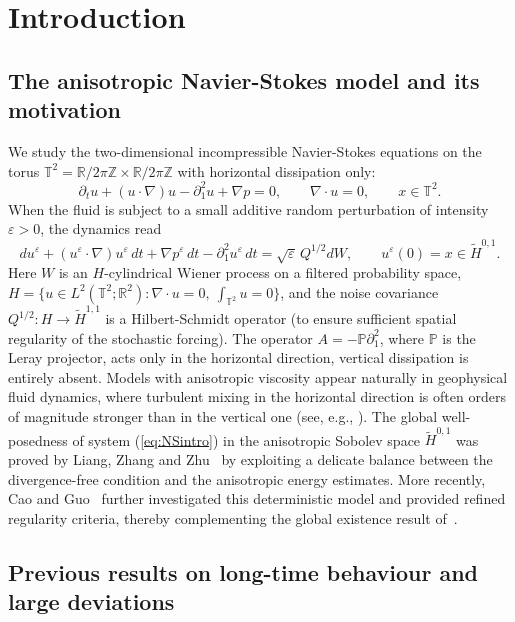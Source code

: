 \documentclass[11pt,a4paper,reqno]{amsart}
\theoremstyle{definition}
\begin{document}
\section{Introduction}
\label{sec:intro}

\subsection{The anisotropic Navier-Stokes model and its motivation}
We study the two-dimensional incompressible Navier-Stokes equations on the
torus $\mathbb{T}^2 = \mathbb{R}/2\pi\mathbb{Z} \times \mathbb{R}/2\pi\mathbb{Z}$ with horizontal dissipation only:
\begin{equation}\label{eq:NSintro}
  \partial_t u + (u\cdot\nabla)u - \partial_1^2 u + \nabla p = 0,\qquad
  \nabla\cdot u = 0,\qquad x\in\mathbb{T}^2 .
\end{equation}
When the fluid is subject to a small additive random perturbation of intensity
$\varepsilon>0$, the dynamics read
\begin{equation}\label{eq:SNSintro}
  du^\varepsilon + (u^\varepsilon\cdot\nabla)u^\varepsilon \,dt + \nabla p^\varepsilon \,dt
  - \partial_1^2 u^\varepsilon \,dt = \sqrt\varepsilon \, Q^{1/2} dW,\qquad
  u^\varepsilon(0)=x\in\widetilde H^{0,1}.
\end{equation}
Here $W$ is an $H$-cylindrical Wiener process on a filtered probability space,
$H=\{u\in L^2(\mathbb{T}^2;\mathbb{R}^2):\nabla\cdot u=0,\ \int_{\mathbb{T}^2}u=0\}$, and the noise
covariance $Q^{1/2}:H\to\widetilde H^{1,1}$ is a Hilbert-Schmidt operator
(to ensure sufficient spatial regularity of the stochastic forcing).  The
operator $A=-\mathbb P\partial_1^2$, where $\mathbb P$ is the Leray projector,
acts only in the horizontal direction, vertical dissipation is entirely absent.
Models with anisotropic viscosity appear naturally in geophysical fluid dynamics,
where turbulent mixing in the horizontal direction is often orders of magnitude
stronger than in the vertical one (see, e.g., \cite{CushmanRoisin, Pedlosky}).
The global well-posedness of system (\ref{eq:NSintro}) in
the anisotropic Sobolev space $\widetilde H^{0,1}$ was proved by Liang, Zhang
and Zhu~\cite{LZZ} by exploiting a delicate balance between the divergence-free condition
 and the anisotropic energy estimates.  More recently, Cao and Guo~\cite{CaoGuo2026} further
investigated this deterministic model and provided refined regularity criteria,
thereby complementing the global existence result of~\cite{LZZ}.


\subsection{Previous results on long-time behaviour and large deviations}
\end{document}
